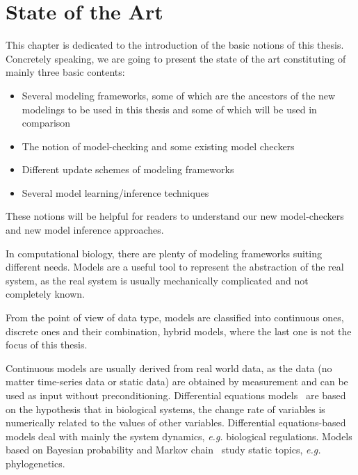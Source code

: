 \chapter{State of the Art}\label{chap:stateOfTheArt}
\begin{mybox}
This chapter is dedicated to the introduction of the basic notions of this thesis.
Concretely speaking, we are going to present the state of the art constituting of mainly three basic contents:

\begin{itemize}
    \item Several modeling frameworks, some of which are the ancestors of the new modelings to be used in this thesis and some of which will be used in comparison
    \item The notion of model-checking and some existing %
    model checkers 
    \item Different update schemes of modeling frameworks
    \item Several model learning/inference techniques
\end{itemize}

These notions will be helpful for readers to understand our new model-checkers and new model inference approaches.
\end{mybox}

In computational biology, there are plenty of modeling frameworks suiting different needs.
Models are a useful tool to represent the abstraction of the real system, as the real system is usually mechanically complicated and not completely known.

From the point of view of data type, models are classified into continuous ones, discrete ones and their combination, hybrid models, where the last one is not the focus of this thesis.

Continuous models are usually derived from real world data, as the data (no matter time-series data or static data) are obtained by measurement and can be used as input without preconditioning.
Differential equations models~\cite{glass1973logical,snoussi1989qualitative,thomas1990biological} are based on the hypothesis that in biological systems, the change rate of variables is numerically related to the values of other variables. 
Differential equations-based models deal with mainly the system dynamics, \textit{e.g.} biological regulations.
Models based on Bayesian probability and Markov chain~\cite{huelsenbeck2001mrbayes,larget1999markov} study static topics, \textit{e.g.} phylogenetics.


